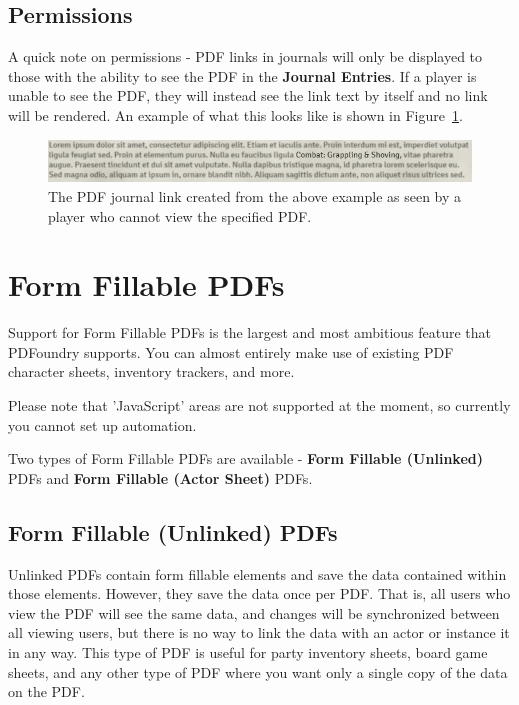 \documentclass{article}
\begin{document}
    \subsection{Permissions}
    A quick note on permissions - PDF links in journals will only be displayed to those with the ability to see the PDF in the \textbf{Journal Entries}. If a player is unable to see the PDF, they will instead see the link text by itself and no link will be rendered. An example of what this looks like is shown in Figure~\ref{fig:rich-text-link-example-permissions}.

    \begin{figure}[h]
        \centering
        \includegraphics[width=1\textwidth]{images/rich-text-link-example-permissions.png}
        \caption{The PDF journal link created from the above example as seen by a player who cannot view the specified PDF.}
        \label{fig:rich-text-link-example-permissions}
    \end{figure}

    \section{Form Fillable PDFs}
    \label{sec:form-fillable-pdfs}

    Support for Form Fillable PDFs is the largest and most ambitious feature that PDFoundry supports. You can almost entirely make use of existing PDF character sheets, inventory trackers, and more.

    Please note that 'JavaScript' areas are not supported at the moment, so currently you cannot set up automation.

    Two types of Form Fillable PDFs are available - \textbf{Form Fillable (Unlinked)} PDFs and \textbf{Form Fillable (Actor Sheet)} PDFs.

    \subsection{Form Fillable (Unlinked) PDFs}
    Unlinked PDFs contain form fillable elements and save the data contained within those elements. However, they save the data once per PDF. That is, all users who view the PDF will see the same data, and changes will be synchronized between all viewing users, but there is no way to link the data with an actor or instance it in any way. This type of PDF is useful for party inventory sheets, board game sheets, and any other type of PDF where you want only a single copy of the data on the PDF.
\end{document}
